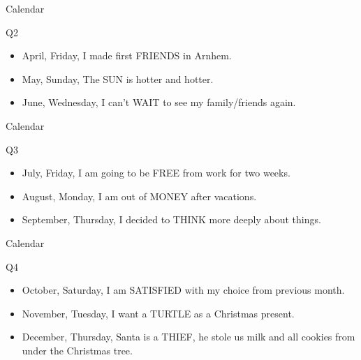 \begin{frame}{Calendar}
  \begin{block}{Q2}
    \begin{itemize}
      \item April, Friday, I made first FRIENDS in Arnhem. 
      \item May, Sunday, The SUN is hotter and hotter.
      \item June, Wednesday, I can't WAIT to see my family/friends again.
    \end{itemize}
  \end{block}
\end{frame}

\begin{frame}{Calendar}
  \begin{block}{Q3}
    \begin{itemize}
      \item July, Friday, I am going to be FREE from work for two weeks. 
      \item August, Monday, I am out of MONEY after vacations. 
      \item September, Thursday, I decided to THINK more deeply about things.
    \end{itemize}
  \end{block}
\end{frame}

\begin{frame}{Calendar}
  \begin{block}{Q4}
    \begin{itemize}
      \item October, Saturday, I am SATISFIED with my choice from previous month.
      \item November, Tuesday, I want a TURTLE as a Christmas present.
      \item December, Thursday, Santa is a THIEF, he stole us milk and all cookies from under the Christmas tree. 
    \end{itemize}
  \end{block}
\end{frame}

